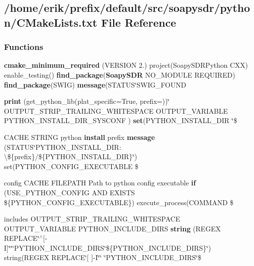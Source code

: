 \subsection{/home/erik/prefix/default/src/soapysdr/python/\+C\+Make\+Lists.txt File Reference}
\label{soapysdr_2python_2CMakeLists_8txt}
\subsubsection*{Functions}
\begin{DoxyCompactItemize}
\item 
{\bf cmake\+\_\+minimum\+\_\+required} (V\+E\+R\+S\+I\+ON 2.) project(Soapy\+S\+D\+R\+Python C\+XX) enable\+\_\+testing() {\bf find\+\_\+package}({\bf Soapy\+S\+DR} N\+O\+\_\+\+M\+O\+D\+U\+LE R\+E\+Q\+U\+I\+R\+ED) {\bf find\+\_\+package}(S\+W\+IG) {\bf message}(S\+T\+A\+T\+US\char`\"{}S\+W\+I\+G\+\_\+\+F\+O\+U\+ND
\item 
{\bf print} (get\+\_\+python\+\_\+lib(plat\+\_\+specific=True, prefix=\textquotesingle{}\textquotesingle{}))\char`\"{} O\+U\+T\+P\+U\+T\+\_\+\+S\+T\+R\+I\+P\+\_\+\+T\+R\+A\+I\+L\+I\+N\+G\+\_\+\+W\+H\+I\+T\+E\+S\+P\+A\+CE O\+U\+T\+P\+U\+T\+\_\+\+V\+A\+R\+I\+A\+B\+LE P\+Y\+T\+H\+O\+N\+\_\+\+I\+N\+S\+T\+A\+L\+L\+\_\+\+D\+I\+R\+\_\+\+S\+Y\+S\+C\+O\+NF ) {\bf set}(P\+Y\+T\+H\+O\+N\+\_\+\+I\+N\+S\+T\+A\+L\+L\+\_\+\+D\+IR \char`\"{}\$
\item 
C\+A\+C\+HE S\+T\+R\+I\+NG python {\bf install} prefix {\bf message} (S\+T\+A\+T\+US\char`\"{}P\+Y\+T\+H\+O\+N\+\_\+\+I\+N\+S\+T\+A\+L\+L\+\_\+\+D\+I\+R\+: \textbackslash{}\$\{prefix\}/\$\{P\+Y\+T\+H\+O\+N\+\_\+\+I\+N\+S\+T\+A\+L\+L\+\_\+\+D\+IR\}\char`\"{}) set(P\+Y\+T\+H\+O\+N\+\_\+\+C\+O\+N\+F\+I\+G\+\_\+\+E\+X\+E\+C\+U\+T\+A\+B\+LE \$
\item 
config C\+A\+C\+HE F\+I\+L\+E\+P\+A\+TH Path to python config executable {\bf if} (U\+S\+E\+\_\+\+P\+Y\+T\+H\+O\+N\+\_\+\+C\+O\+N\+F\+IG A\+ND E\+X\+I\+S\+TS \$\{P\+Y\+T\+H\+O\+N\+\_\+\+C\+O\+N\+F\+I\+G\+\_\+\+E\+X\+E\+C\+U\+T\+A\+B\+LE\}) execute\+\_\+process(C\+O\+M\+M\+A\+ND \$
\item 
includes O\+U\+T\+P\+U\+T\+\_\+\+S\+T\+R\+I\+P\+\_\+\+T\+R\+A\+I\+L\+I\+N\+G\+\_\+\+W\+H\+I\+T\+E\+S\+P\+A\+CE O\+U\+T\+P\+U\+T\+\_\+\+V\+A\+R\+I\+A\+B\+LE P\+Y\+T\+H\+O\+N\+\_\+\+I\+N\+C\+L\+U\+D\+E\+\_\+\+D\+I\+RS {\bf string} (R\+E\+G\+EX R\+E\+P\+L\+A\+CE\char`\"{}$^\wedge$[-\/I]\char`\"{}\char`\"{}\char`\"{}P\+Y\+T\+H\+O\+N\+\_\+\+I\+N\+C\+L\+U\+D\+E\+\_\+\+D\+I\+RS\char`\"{}\$\{P\+Y\+T\+H\+O\+N\+\_\+\+I\+N\+C\+L\+U\+D\+E\+\_\+\+D\+I\+RS\}\char`\"{}) string(R\+E\+G\+EX R\+E\+P\+L\+A\+CE\char`\"{}[ ]-\/I\char`\"{}\char`\"{} \char`\"{}P\+Y\+T\+H\+O\+N\+\_\+\+I\+N\+C\+L\+U\+D\+E\+\_\+\+D\+I\+RS\char`\"{}\$

\end{DoxyCompactItemize}
